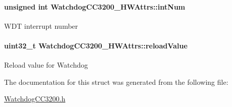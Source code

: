 \paragraph[{int\-Num}]{\setlength{\rightskip}{0pt plus 5cm}unsigned int Watchdog\-C\-C3200\-\_\-\-H\-W\-Attrs\-::int\-Num}\label{struct_watchdog_c_c3200___h_w_attrs_a49a550cfb37091acc532cfe0330a1c15}
W\-D\-T interrupt number 
\paragraph[{reload\-Value}]{\setlength{\rightskip}{0pt plus 5cm}uint32\-\_\-t Watchdog\-C\-C3200\-\_\-\-H\-W\-Attrs\-::reload\-Value}\label{struct_watchdog_c_c3200___h_w_attrs_a746d7acdd50828840459d4d78171d780}
Reload value for Watchdog 

The documentation for this struct was generated from the following file\-:\begin{DoxyCompactItemize}
\item 
\hyperlink{_watchdog_c_c3200_8h}{Watchdog\-C\-C3200.\-h}\end{DoxyCompactItemize}
